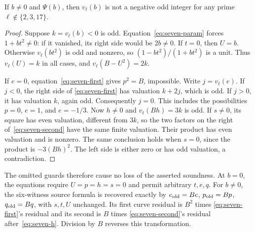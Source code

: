 \begin{lemma}
\label{lem:original-seven-parity-soundness}
If $b\ne0$ and $\Psi(b)$, then $v_\ell(b)$ is not a negative odd
integer for any prime $\ell\notin\{2,3,17\}$.
\end{lemma}
\begin{proof}
Suppose $k=v_\ell(b)<0$ is odd. Equation~\eqref{eq:seven-param}
forces $1+bt^2\ne0$: if it vanished, its right side would be $2b\ne0$.
If $t=0$, then $U=b$. Otherwise $v_\ell(bt^2)$ is odd and nonzero,
so $(1-bt^2)/(1+bt^2)$ is a unit. Thus $v_\ell(U)=k$ in all cases,
and $v_\ell(B-U^2)=2k$.

If $e=0$, equation~\eqref{eq:seven-first} gives $p^2=B$, impossible.
Write $j=v_\ell(e)$. If $j<0$, the right side of
\eqref{eq:seven-first} has valuation $k+2j$, which is odd.
If $j>0$, it has valuation $k$, again odd. Consequently $j=0$.
This includes the possibilities $p=0$, $e=1$, and $e=-1/3$.
Now $h\ne0$ and $v_\ell(Bh)=3k$ is odd. If $s\ne0$, its square
has even valuation, different from $3k$, so the two factors on the
right of~\eqref{eq:seven-second} have the same finite valuation.
Their product has even valuation and is nonzero. The same conclusion
holds when $s=0$, since the product is $-3(Bh)^2$.
The left side is either zero or has odd valuation, a contradiction.
\end{proof}

The omitted guards therefore cause no loss of the asserted soundness.
At $b=0$, the equations require $U=p=h=s=0$ and permit arbitrary
$t,e,q$. For $b\ne0$, the six-witness source formula is recovered
exactly by $e_{\rm old}=Be$, $p_{\rm old}=Bp$, $q_{\rm old}=Bq$,
with $s,t,U$ unchanged. Its first curve residual is $B^2$ times
\eqref{eq:seven-first}'s residual and its second is $B$ times
\eqref{eq:seven-second}'s residual after~\eqref{eq:seven-h}.
Division by $B$ reverses this transformation.

